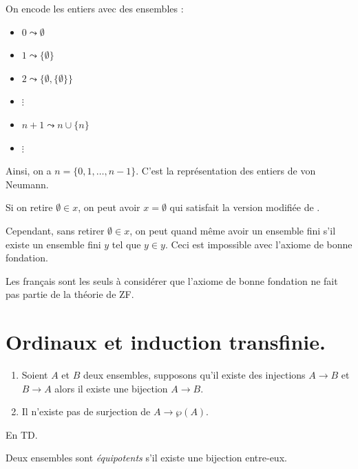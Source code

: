 \documentclass[./main]{subfiles}
\begin{document}
  On encode les entiers avec des ensembles :
  \begin{itemize}
    \item $0 \leadsto \emptyset$
    \item $1 \leadsto \{\emptyset\} $
    \item $2 \leadsto \{\emptyset, \{\emptyset\}\}  $
    \item \quad \quad $\vdots$
    \item $n+1 \leadsto n \cup \{n\}$
    \item \quad \quad $\vdots$
  \end{itemize}

  Ainsi, on a $n  =\{0, 1, \ldots, n-1\}$. C'est la représentation des entiers de von Neumann.

  \begin{rmk}
    Si on retire $\emptyset \in x$, on peut avoir $x = \emptyset$ qui satisfait la version modifiée de .

    Cependant, sans retirer $\emptyset \in x$, on peut quand même avoir un ensemble fini s'il existe un ensemble fini $y$ tel que $y \in y$.
    Ceci est impossible avec l'axiome de bonne fondation.
  \end{rmk}

  \begin{rmk}
    Les français sont les seuls à considérer que l'axiome de bonne fondation ne fait pas partie de la théorie de ZF.
  \end{rmk}

  \section{Ordinaux et induction transfinie.}


  \begin{thm}[Cantor]
    \begin{enumerate}
      \item Soient $A$ et $B$ deux ensembles, supposons qu'il existe des injections $A \to B$ et $B \to A$ alors il existe une bijection $A \to B$.
      \item Il n'existe pas de surjection de $A \to \wp(A)$.
    \end{enumerate}
  \end{thm}
  \begin{prv}
    En TD.
  \end{prv}

  \begin{defn}
    Deux ensembles sont \textit{équipotents} s'il existe une bijection entre-eux.
  \end{defn}
\end{document}
